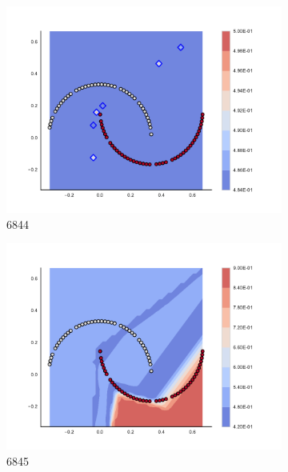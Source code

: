 \begin{figure}[h]
\begin{subfigure}[b]{0.09\textwidth}
    \includegraphics[clip, trim=2.35cm 1.75cm 4.5cm 0cm,width=\textwidth]{img/convergence/6844.pdf}
    \caption{6844}
    \label{fig:convergence_6844}
\end{subfigure}
%
\begin{subfigure}[b]{0.09\textwidth}
    \includegraphics[clip, trim=2.35cm 1.75cm 4.5cm 0cm,width=\textwidth]{img/convergence/6845.pdf}
    \caption{6845}
    \label{fig:convergence_6845}
\end{subfigure}
%
\begin{subfigure}[b]{0.09\textwidth}

\end{subfigure}
\end{figure}

